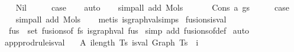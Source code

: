 \begin{isabellebody}
\ \ \isamarkupfalse%
\ Nil\isanewline
\ \ \isamarkupfalse%
\ \isamarkupfalse%
\ {\isacharquery}{\kern0pt}case\isanewline
\ \ \isamarkupfalse%
\ auto\isanewline
\ \ \isamarkupfalse%
\ {\isacharparenleft}{\kern0pt}simp{\isacharunderscore}{\kern0pt}all\ add{\isacharcolon}{\kern0pt}\ Mols{}{\isacharparenright}{\kern0pt}\isanewline
\ \ \isamarkupfalse%
\isanewline
{}\isamarkupfalse%
\isanewline
\ \ \isamarkupfalse%
\ {\isacharparenleft}{\kern0pt}Cons\ a\ gs{\isacharparenright}{\kern0pt}\isanewline
\ \ \isamarkupfalse%
\ \isamarkupfalse%
\ {\isacharquery}{\kern0pt}case\isanewline
\ \ \isamarkupfalse%
\ {\isacharparenleft}{\kern0pt}simp{\isacharunderscore}{\kern0pt}all\ add{\isacharcolon}{\kern0pt}\ Mols{}{\isacharparenright}{\kern0pt}\isanewline
\ \ \isamarkupfalse%
\ {\isacharparenleft}{\kern0pt}metis\ is{\isacharunderscore}{\kern0pt}graph{\isacharunderscore}{\kern0pt}val{\isachardot}{\kern0pt}simps{\isacharparenleft}{\kern0pt}{}{\isacharparenright}{\kern0pt}{\isacharparenright}{\kern0pt}\isanewline
{}\isamarkupfalse%
%
\endisatagproof
{\isafoldproof}%
%
\isadelimproof
\isanewline
%
\endisadelimproof
\isanewline
\isanewline
{}\isamarkupfalse%
\ fusions{\isacharunderscore}{\kern0pt}is{\isacharunderscore}{\kern0pt}val{\isacharcolon}{\kern0pt}\isanewline
\ \ {\isachardoublequoteopen}{\isasymforall}fus\ {\isasymin}\ set\ {\isacharparenleft}{\kern0pt}fusions{\isacharunderscore}{\kern0pt}of\ fs{\isacharparenright}{\kern0pt}{\isachardot}{\kern0pt}\ is{\isacharunderscore}{\kern0pt}graph{\isacharunderscore}{\kern0pt}val\ fus{\isachardoublequoteclose}\isanewline
%
\isadelimproof
%
\endisadelimproof
%
\isatagproof
{}\isamarkupfalse%
\ {\isacharparenleft}{\kern0pt}simp\ add{\isacharcolon}{\kern0pt}\ fusions{\isacharunderscore}{\kern0pt}of{\isacharunderscore}{\kern0pt}def{\isacharparenright}{\kern0pt}\isanewline
{}\isamarkupfalse%
\ auto%
\endisatagproof
{\isafoldproof}%
%
\isadelimproof
\isanewline
%
\endisadelimproof
\isanewline
\isanewline
{}\isamarkupfalse%
\ app{\isacharunderscore}{\kern0pt}prodrule{\isacharunderscore}{\kern0pt}is{\isacharunderscore}{\kern0pt}val{\isacharcolon}{\kern0pt}\isanewline
\ \ \ A{}{\isacharcolon}{\kern0pt}\ {\isachardoublequoteopen}{\isasymforall}i{\isacharless}{\kern0pt}length\ Ts{\isachardot}{\kern0pt}\ is{\isacharunderscore}{\kern0pt}val\ {\isacharparenleft}{\kern0pt}Graph\ {\isacharparenleft}{\kern0pt}Ts\ {\isacharbang}{\kern0pt}\ i{\isacharparenright}{\kern0pt}{\isacharparenright}{\kern0pt}{\isachardoublequoteclose}\isanewline

\end{isabellebody}
